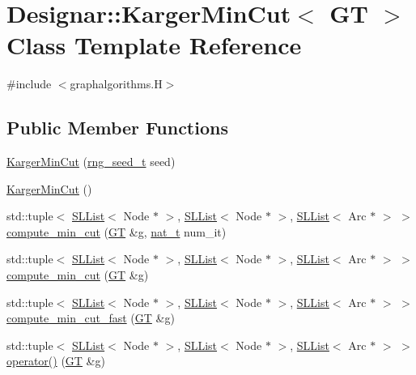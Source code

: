 \hypertarget{class_designar_1_1_karger_min_cut}{}\section{Designar\+:\+:Karger\+Min\+Cut$<$ GT $>$ Class Template Reference}
\label{class_designar_1_1_karger_min_cut}


{\ttfamily \#include $<$graphalgorithms.\+H$>$}

\subsection*{Public Member Functions}
\begin{DoxyCompactItemize}
\item 
\hyperlink{class_designar_1_1_karger_min_cut_ab2b55a4d8b0d64a469cecafeeac8fcf1}{Karger\+Min\+Cut} (\hyperlink{namespace_designar_ad621b5646d45288c5d6a1e1dfe7531a8}{rng\+\_\+seed\+\_\+t} seed)
\item 
\hyperlink{class_designar_1_1_karger_min_cut_a1f8bce9bd104fb9b6ba7744c58dbf68b}{Karger\+Min\+Cut} ()
\item 
std\+::tuple$<$ \hyperlink{class_designar_1_1_s_l_list}{S\+L\+List}$<$ Node $\ast$ $>$, \hyperlink{class_designar_1_1_s_l_list}{S\+L\+List}$<$ Node $\ast$ $>$, \hyperlink{class_designar_1_1_s_l_list}{S\+L\+List}$<$ Arc $\ast$ $>$ $>$ \hyperlink{class_designar_1_1_karger_min_cut_a62479a7ca1e7202a93cded87a9d09b8b}{compute\+\_\+min\+\_\+cut} (\hyperlink{demo-buildgraph_8_c_a3001c40d2c31ca87ed96cd7d1334a55e}{GT} \&g, \hyperlink{namespace_designar_aa72662848b9f4815e7bf31a7cf3e33d1}{nat\+\_\+t} num\+\_\+it)
\item 
std\+::tuple$<$ \hyperlink{class_designar_1_1_s_l_list}{S\+L\+List}$<$ Node $\ast$ $>$, \hyperlink{class_designar_1_1_s_l_list}{S\+L\+List}$<$ Node $\ast$ $>$, \hyperlink{class_designar_1_1_s_l_list}{S\+L\+List}$<$ Arc $\ast$ $>$ $>$ \hyperlink{class_designar_1_1_karger_min_cut_a7a1a4f9e7895ca7923d4f563d6acf689}{compute\+\_\+min\+\_\+cut} (\hyperlink{demo-buildgraph_8_c_a3001c40d2c31ca87ed96cd7d1334a55e}{GT} \&g)
\item 
std\+::tuple$<$ \hyperlink{class_designar_1_1_s_l_list}{S\+L\+List}$<$ Node $\ast$ $>$, \hyperlink{class_designar_1_1_s_l_list}{S\+L\+List}$<$ Node $\ast$ $>$, \hyperlink{class_designar_1_1_s_l_list}{S\+L\+List}$<$ Arc $\ast$ $>$ $>$ \hyperlink{class_designar_1_1_karger_min_cut_a6c61a57cab52387d2c54e6db0bc58aa9}{compute\+\_\+min\+\_\+cut\+\_\+fast} (\hyperlink{demo-buildgraph_8_c_a3001c40d2c31ca87ed96cd7d1334a55e}{GT} \&g)
\item 
std\+::tuple$<$ \hyperlink{class_designar_1_1_s_l_list}{S\+L\+List}$<$ Node $\ast$ $>$, \hyperlink{class_designar_1_1_s_l_list}{S\+L\+List}$<$ Node $\ast$ $>$, \hyperlink{class_designar_1_1_s_l_list}{S\+L\+List}$<$ Arc $\ast$ $>$ $>$ \hyperlink{class_designar_1_1_karger_min_cut_a733802123d2510126abd4238688432ca}{operator()} (\hyperlink{demo-buildgraph_8_c_a3001c40d2c31ca87ed96cd7d1334a55e}{GT} \&g)
\end{DoxyCompactItemize}


